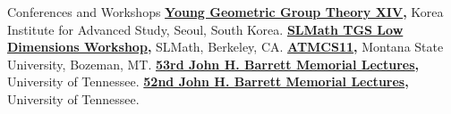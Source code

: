 \begin{rubric}{Conferences and Workshops}
\entry*[2026] \textbf{\href{https://sites.google.com/view/yggt2026/}{Young Geometric Group Theory XIV},} Korea Institute for Advanced Study, Seoul, South Korea.
\entry*[2026] \textbf{\href{https://www.slmath.org/workshops/1141}{SLMath TGS Low Dimensions Workshop},} SLMath, Berkeley, CA.
\entry*[2025] \textbf{\href{https://comptag.github.io/atmcs11/}{ATMCS11},} Montana State University, Bozeman, MT.
\entry*[2025] \textbf{\href{https://math.utk.edu/barrett/53rd-lectures/}{53rd John H. Barrett Memorial Lectures},} University of Tennessee.
\entry*[2024] \textbf{\href{https://math.utk.edu/barrett/52nd-lectures/}{52nd John H. Barrett Memorial Lectures},} University of Tennessee.
\end{rubric}
